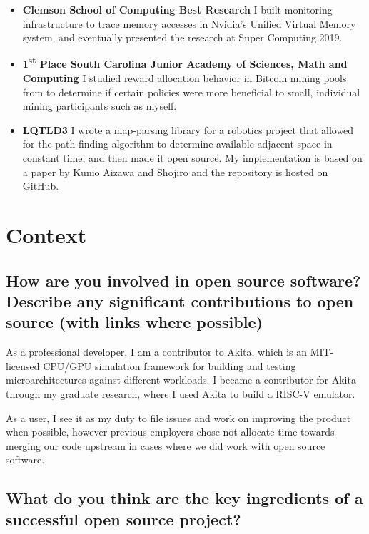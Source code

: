 \documentclass{article}
\begin{document}
\begin{itemize}
  \item \textbf{Clemson School of Computing Best Research} I built monitoring
        infrastructure to trace memory accesses in Nvidia's Unified Virtual
        Memory system, and eventually presented the research at Super
        Computing 2019.

  \item \textbf{1\textsuperscript{st} Place South Carolina Junior Academy of Sciences, Math
          and Computing} I studied reward allocation behavior in Bitcoin mining pools
        from to determine if certain policies were more beneficial to
        small, individual mining participants such as myself.

  \item \textbf{LQTLD3} I wrote a map-parsing library for a robotics project
        that allowed for the path-finding algorithm to determine available adjacent
        space in constant time, and then made it open source. My implementation is
        based on a paper by Kunio Aizawa and Shojiro\cite{4538229} and the repository
        is hosted on GitHub.

\end{itemize}
\section{Context}
\subsection{How are you involved in open source software? Describe any
  significant contributions to open source (with links where possible)}

As a professional developer, I am a contributor to Akita\cite{akita}, which is
an MIT-licensed CPU/GPU simulation framework for building and testing
microarchitectures against different workloads. I became a contributor for Akita
through my graduate research, where I used Akita to build a RISC-V emulator.

As a user, I see it as my duty to file issues and work on improving the product
when possible, however previous employers chose not allocate time towards
merging our code upstream in cases where we did work with open source software.

\subsection{What do you think are the key ingredients of a successful open
  source project?}
\end{document}
